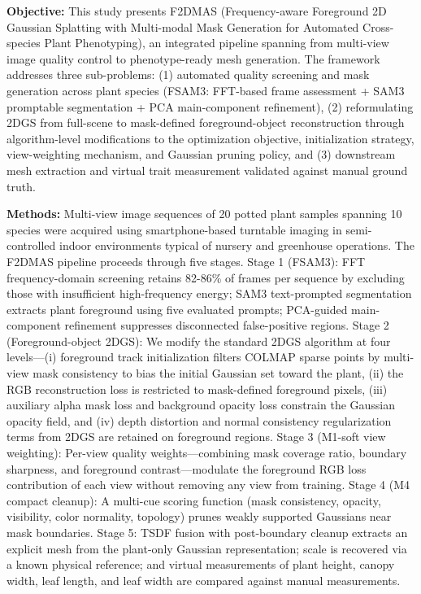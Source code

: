 \documentclass[11pt,a4paper]{article}
\begin{document}
\textbf{Objective:} This study presents F2DMAS (Frequency-aware
Foreground 2D Gaussian Splatting with Multi-modal Mask Generation for
Automated Cross-species Plant Phenotyping), an integrated pipeline
spanning from multi-view image quality control to phenotype-ready mesh
generation. The framework addresses three sub-problems: (1) automated
quality screening and mask generation across plant species (FSAM3:
FFT-based frame assessment + SAM3 promptable segmentation + PCA
main-component refinement), (2) reformulating 2DGS from full-scene to
mask-defined foreground-object reconstruction through algorithm-level
modifications to the optimization objective, initialization strategy,
view-weighting mechanism, and Gaussian pruning policy, and (3)
downstream mesh extraction and virtual trait measurement validated
against manual ground truth.

\textbf{Methods:} Multi-view image sequences of 20 potted plant samples
spanning 10 species were acquired using smartphone-based turntable
imaging in semi-controlled indoor environments typical of nursery and
greenhouse operations. The F2DMAS pipeline proceeds through five stages.
Stage 1 (FSAM3): FFT frequency-domain screening retains 82-86\% of
frames per sequence by excluding those with insufficient high-frequency
energy; SAM3 text-prompted segmentation extracts plant foreground using
five evaluated prompts; PCA-guided main-component refinement suppresses
disconnected false-positive regions. Stage 2 (Foreground-object 2DGS):
We modify the standard 2DGS algorithm at four levels---(i) foreground
track initialization filters COLMAP sparse points by multi-view mask
consistency to bias the initial Gaussian set toward the plant, (ii) the
RGB reconstruction loss is restricted to mask-defined foreground pixels,
(iii) auxiliary alpha mask loss and background opacity loss constrain
the Gaussian opacity field, and (iv) depth distortion and normal
consistency regularization terms from 2DGS are retained on foreground
regions. Stage 3 (M1-soft view weighting): Per-view quality
weights---combining mask coverage ratio, boundary sharpness, and
foreground contrast---modulate the foreground RGB loss contribution of
each view without removing any view from training. Stage 4 (M4 compact
cleanup): A multi-cue scoring function (mask consistency, opacity,
visibility, color normality, topology) prunes weakly supported Gaussians
near mask boundaries. Stage 5: TSDF fusion with post-boundary cleanup
extracts an explicit mesh from the plant-only Gaussian representation;
scale is recovered via a known physical reference; and virtual
measurements of plant height, canopy width, leaf length, and leaf width
are compared against manual measurements.
\end{document}
